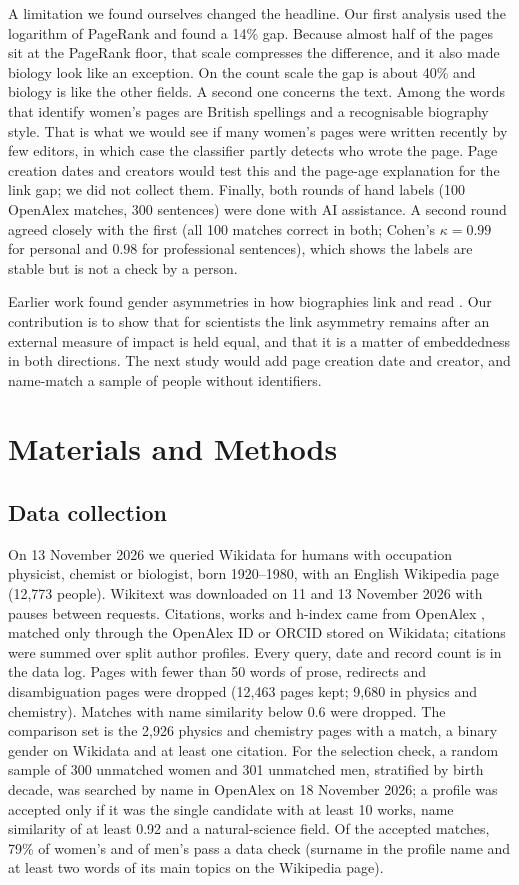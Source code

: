 \documentclass[9pt,twocolumn,twoside,lineno]{pnas-new}
\begin{document}
A limitation we found ourselves changed the headline. Our first analysis used the logarithm of PageRank and found a 14\% gap. Because almost half of the pages sit at the PageRank floor, that scale compresses the difference, and it also made biology look like an exception. On the count scale the gap is about 40\% and biology is like the other fields. A second one concerns the text. Among the words that identify women's pages are British spellings and a recognisable biography style. That is what we would see if many women's pages were written recently by few editors, in which case the classifier partly detects who wrote the page. Page creation dates and creators would test this and the page-age explanation for the link gap; we did not collect them. Finally, both rounds of hand labels (100 OpenAlex matches, 300 sentences) were done with AI assistance. A second round agreed closely with the first (all 100 matches correct in both; Cohen's $\kappa=0.99$ for personal and $0.98$ for professional sentences), which shows the labels are stable but is not a check by a person.

Earlier work found gender asymmetries in how biographies link and read \cite{wagner2015man,wagner2016glass,graells2015first}. Our contribution is to show that for scientists the link asymmetry remains after an external measure of impact is held equal, and that it is a matter of embeddedness in both directions. The next study would add page creation date and creator, and name-match a sample of people without identifiers.

\section*{Materials and Methods}

\subsection*{Data collection}
On 13 November 2026 we queried Wikidata \cite{vrandecic2014wikidata} for humans with occupation physicist, chemist or biologist, born 1920--1980, with an English Wikipedia page (12,773 people). Wikitext was downloaded on 11 and 13 November 2026 with pauses between requests. Citations, works and h-index came from OpenAlex \cite{priem2022openalex}, matched only through the OpenAlex ID or ORCID stored on Wikidata; citations were summed over split author profiles. Every query, date and record count is in the data log. Pages with fewer than 50 words of prose, redirects and disambiguation pages were dropped (12,463 pages kept; 9,680 in physics and chemistry). Matches with name similarity below 0.6 were dropped. The comparison set is the 2,926 physics and chemistry pages with a match, a binary gender on Wikidata and at least one citation. For the selection check, a random sample of 300 unmatched women and 301 unmatched men, stratified by birth decade, was searched by name in OpenAlex on 18 November 2026; a profile was accepted only if it was the single candidate with at least 10 works, name similarity of at least 0.92 and a natural-science field. Of the accepted matches, 79\% of women's and of men's pass a data check (surname in the profile name and at least two words of its main topics on the Wikipedia page).
\end{document}
